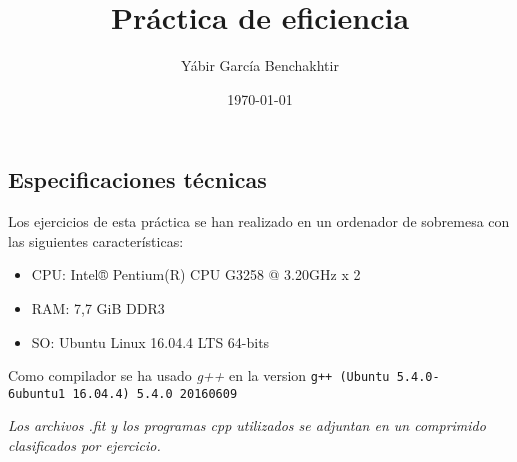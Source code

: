 \documentclass[a4paper,11pt]{article}
\begin{document}
\title{Práctica de eficiencia}
\author{Yábir García Benchakhtir}
\date{\today}
\maketitle

\subsection*{Especificaciones técnicas}

\begin{flushleft}
  Los ejercicios de esta práctica se han realizado en un ordenador de
  sobremesa con las siguientes características:
\end{flushleft}

\begin{itemize}
\item CPU: Intel® Pentium(R) CPU G3258 @ 3.20GHz x 2
\item RAM: 7,7 GiB DDR3
\item SO: Ubuntu Linux 16.04.4 LTS 64-bits
\end{itemize}

\begin{flushleft}
  Como compilador se ha usado \textit{g++} en la version \texttt{g++
    (Ubuntu 5.4.0-6ubuntu1~16.04.4) 5.4.0 20160609}

  
  \textit{Los archivos .fit y los programas cpp utilizados se adjuntan
    en un comprimido clasificados por ejercicio.}

\end{flushleft}


\newpage







\end{document}
